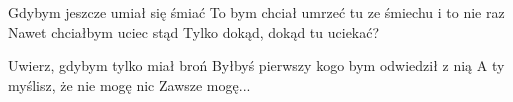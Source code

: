 \documentclass[../../../songbook.tex]{subfiles}
\begin{document}
\-\hspace{1cm} Gdybym jeszcze umiał się śmiać		 \newline	
\-\hspace{1cm} To bym chciał umrzeć tu ze śmiechu i to nie raz		 \newline	
\-\hspace{1cm} Nawet chciałbym uciec stąd		 \newline	
\-\hspace{1cm} Tylko dokąd, dokąd tu uciekać?		 \newline	
	
\-\hspace{1cm} Uwierz, gdybym tylko miał broń		 \newline	
\-\hspace{1cm} Byłbyś pierwszy kogo bym odwiedził z nią		 \newline	
\-\hspace{1cm} A ty myślisz, że nie mogę nic		 \newline	
\-\hspace{1cm} Zawsze mogę...		 \newline	
\end{document}
